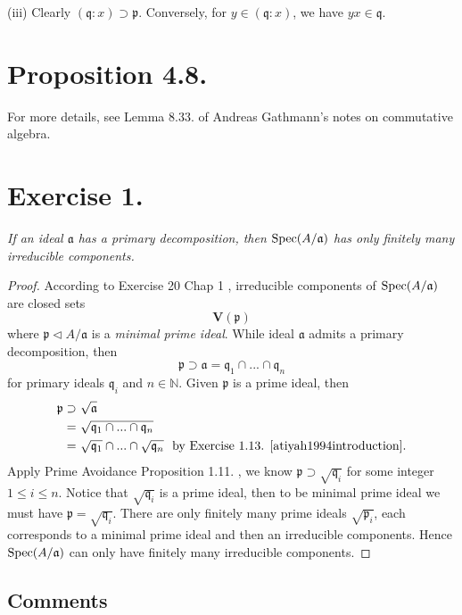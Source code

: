 (iii) Clearly $(\mathfrak q : x)\supset \mathfrak p$. Conversely, for $y\in (\mathfrak q : x)$, we have $yx\in \mathfrak q$.

\section{Proposition 4.8.}

For more details, see Lemma 8.33. of Andreas Gathmann's notes on commutative algebra.

\section{Exercise 1.}
\textit{If an ideal $\mathfrak a$ has a primary decomposition, then $\operatorname{Spec} (A/\mathfrak a)$ has only finitely many irreducible components.
}
\begin{proof}
    According to Exercise 20 Chap 1 \cite{atiyah1994introduction}, irreducible components of $\operatorname{Spec} (A/\mathfrak a)$ are closed sets 
    \[\mathbf V(\mathfrak p)\] where $\mathfrak p\triangleleft A/\mathfrak a$ is a \textit{minimal prime ideal}. While ideal $\mathfrak a$ admits a primary decomposition, then 
    \[\mathfrak p\supset \mathfrak a=\mathfrak q_1\cap ...\cap \mathfrak q_n\] for primary ideals $\mathfrak q_i$ and $n\in\mathbb N$. Given $\mathfrak p$ is a prime ideal, then 
    \begin{align*}
        \mathfrak p \supset&~ \sqrt{\mathfrak a}\\
        =&~ \sqrt{\mathfrak q_1\cap ...\cap \mathfrak q_n}\\
        =&~ \sqrt{\mathfrak q_1}\cap ...\cap \sqrt{\mathfrak q_n} ~\text{ by Exercise 1.13. \cite{atiyah1994introduction}}.
    \end{align*}Apply Prime Avoidance Proposition 1.11. \cite{atiyah1994introduction}, we know $\mathfrak p\supset \sqrt{\mathfrak q_i}$ for some integer $1\leq i\leq n$. Notice that $\sqrt{\mathfrak q_i}$ is a prime ideal, then to be minimal prime ideal we must have $\mathfrak p=\sqrt{\mathfrak q_i}$. There are only finitely many prime ideals $\sqrt{\mathfrak p_i}$, each corresponds to a minimal prime ideal and then an irreducible components. 
    Hence $\operatorname{Spec}(A/\mathfrak a)$ can only have finitely many irreducible components.

\end{proof}

\subsection{Comments}

